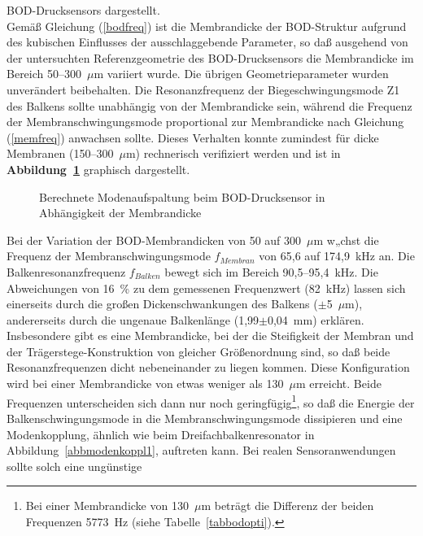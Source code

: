 BOD-Drucksensors dargestellt.\\
Gemäß Gleichung (\ref{bodfreq}) ist die Membrandicke der BOD-Struktur
aufgrund des kubischen Einflusses der ausschlaggebende Parameter,
so daß ausgehend von der untersuchten
Referenzgeometrie des BOD-Drucksensors die Membrandicke im Bereich
50--300~$\mu$m variiert wurde. Die übrigen Geometrieparameter wurden
unverändert beibehalten. Die Resonanzfrequenz der Biegeschwingungsmode Z1
des Balkens sollte unabhängig von der Membrandicke sein, während die
Frequenz der
Membranschwingungsmode proportional zur Membrandicke nach
Gleichung (\ref{memfreq}) anwachsen sollte. Dieses Verhalten konnte
zumindest für dicke Membranen (150--300~$\mu$m) rechnerisch verifiziert
werden und ist in {\bf Abbildung~\ref{abbbodfbfm}} graphisch dargestellt.
\begin{figure}[htb]

\begin{center}

\setbodmem
\end{center}
 \caption{\label{abbbodfbfm}
 Berechnete Modenaufspaltung beim BOD-Drucksensor in Abhängigkeit
 der Membrandicke}
\end{figure}
Bei der Variation der BOD-Membrandicken von 50 auf 300~$\mu$m w„chst
die Frequenz der Membranschwingungsmode $f_{Membran}$ von 65,6 auf 174,9~kHz
an. Die Balkenresonanzfrequenz $f_{Balken}$ bewegt sich im Bereich
90,5--95,4~kHz. Die Abweichungen von 16~\% zu dem gemessenen Frequenzwert
(82~kHz) lassen sich einerseits durch die großen Dickenschwankungen des
Balkens ($\pm$5~$\mu$m), andererseits durch die ungenaue Balkenlänge
(1,99$\pm$0,04~mm) erklären. Insbesondere gibt es eine Membrandicke, bei der die Steifigkeit
der Membran und der Trägerstege-Konstruktion von gleicher Größenordnung sind,
so daß beide Resonanzfrequenzen dicht nebeneinander zu liegen kommen. Diese
Konfiguration wird bei einer Membrandicke von etwas weniger als 130~$\mu$m
erreicht. Beide Frequenzen unterscheiden sich dann nur noch
geringfügig\footnote{Bei einer Membrandicke von 130~$\mu$m beträgt die
Differenz der beiden Frequenzen 5773~Hz (siehe Tabelle~\ref{tabbodopti}).},
so daß die Energie der Balkenschwingungsmode in die Membranschwingungsmode
dissipieren und eine Modenkopplung, ähnlich wie beim
Dreifachbalkenresonator in Abbildung~\ref{abbmodenkoppl1},
auftreten kann. Bei realen Sensoranwendungen sollte solch eine ungünstige

